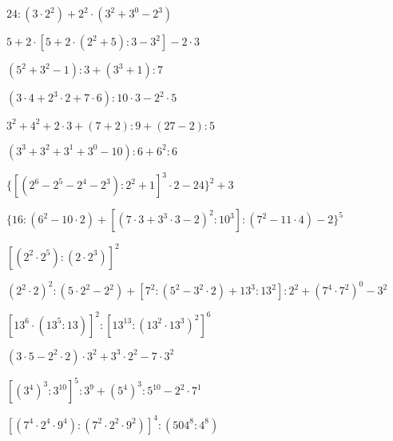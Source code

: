 \begin{esercizio} %
\(24:(3\cdot2^2)+2^2\cdot(3^2+3^0-2^3)\) 
\end{esercizio}
\begin{esercizio} %
\(5+2\cdot[5+2\cdot(2^2+5):3-3^2]-2\cdot3\) 
\end{esercizio}
\begin{esercizio} %
\((5^2+3^2-1):3+(3^3+1):7\) 
\end{esercizio}
\begin{esercizio} %
\((3\cdot4+2^3\cdot2+7\cdot6):10\cdot3-2^2\cdot5\) 
\end{esercizio}
\begin{esercizio} %
\(3^2+4^2+2\cdot3+(7+2):9+(27-2):5\) 
\end{esercizio}
\begin{esercizio} %
\((3^3+3^2+3^1+3^0-10):6+6^2:6\) 
\end{esercizio}
\begin{esercizio} %
\(\{[(2^6-2^5-2^4-2^3):2^2+1]^3\cdot2-24\}^2+3\) 
\end{esercizio}
\begin{esercizio} %
\(\{16:(6^2-10\cdot2)+[(7\cdot3+3^3\cdot3-2)^2:10^3]:(7^2-11\cdot4)-2\}^5\)
\end{esercizio}
\begin{esercizio} %
\([(2^2\cdot2^5):(2\cdot2^3)]^2\) 
\end{esercizio}
\begin{esercizio} %
\((2^2\cdot2)^2:(5\cdot2^2-2^2)+[7^2:(5^2-3^2\cdot2)+13^3:13^2]:2^2+(7^4\cdot7
^2)^0-3^2\) 
\end{esercizio}
\begin{esercizio} %
\([13^6\cdot(13^5:13)]^2:[13^{13}:(13^2\cdot13^3)^2]^6\) 
\end{esercizio}
\begin{esercizio} %
\((3\cdot5-2^2\cdot2)\cdot3^2+3^3\cdot2^2-7\cdot3^2\) 
\end{esercizio}
\begin{esercizio} %
\([(3^4)^3:3^{10}]^5:3^9+(5^4)^3:5^{10}-2^2\cdot7^1\) 
\end{esercizio}
\begin{esercizio} %
\([(7^4\cdot2^4\cdot9^4):(7^2\cdot2^2\cdot9^2)]^4:(504^8:4^8)\) 
\end{esercizio}
